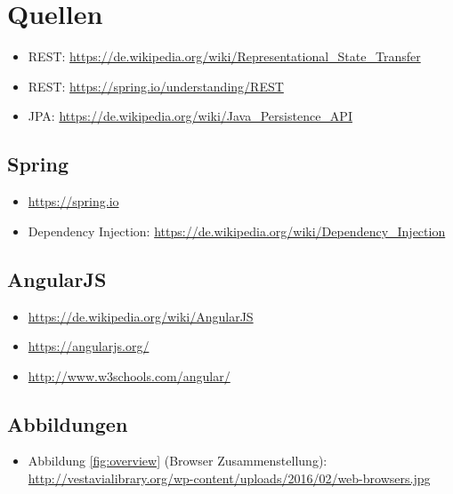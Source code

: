 \section{Quellen}

\begin{itemize}
	\item REST: \url{https://de.wikipedia.org/wiki/Representational_State_Transfer} 
	\item REST: \url{https://spring.io/understanding/REST} 
	\item JPA: \url{https://de.wikipedia.org/wiki/Java_Persistence_API} 
\end{itemize}

\subsection{Spring}

\begin{itemize}
	\item \url{https://spring.io}
		\item Dependency Injection: \url{https://de.wikipedia.org/wiki/Dependency_Injection}
\end{itemize}

\subsection{AngularJS}

\begin{itemize}
	\item \url{https://de.wikipedia.org/wiki/AngularJS} 
	\item \url{https://angularjs.org/}
	\item \url{http://www.w3schools.com/angular/}
\end{itemize}

\subsection{Abbildungen}

\begin{itemize}
	\item Abbildung \ref{fig:overview} (Browser Zusammenstellung): \url{http://vestavialibrary.org/wp-content/uploads/2016/02/web-browsers.jpg}

\end{itemize}